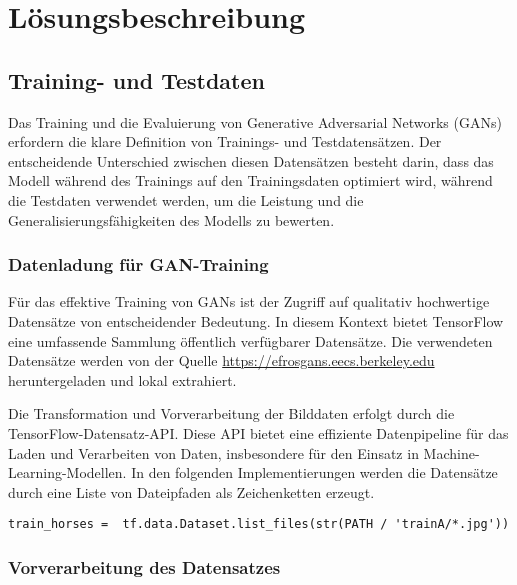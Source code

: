 \chapter{Lösungsbeschreibung}
\section{Training- und Testdaten}
Das Training und die Evaluierung von Generative Adversarial Networks (GANs) erfordern die klare Definition von Trainings- und Testdatensätzen. Der entscheidende Unterschied zwischen diesen Datensätzen besteht darin, dass das Modell während des Trainings auf den Trainingsdaten optimiert wird, während die Testdaten verwendet werden, um die Leistung und die Generalisierungsfähigkeiten des Modells zu bewerten.

\subsection{Datenladung für GAN-Training}
Für das effektive Training von GANs ist der Zugriff auf qualitativ hochwertige Datensätze von entscheidender Bedeutung. In diesem Kontext bietet TensorFlow eine umfassende Sammlung öffentlich verfügbarer Datensätze. Die verwendeten Datensätze werden von der Quelle \url{https://efrosgans.eecs.berkeley.edu} heruntergeladen und lokal extrahiert.



Die Transformation und Vorverarbeitung der Bilddaten erfolgt durch die TensorFlow-Datensatz-API. Diese API bietet eine effiziente Datenpipeline für das Laden und Verarbeiten von Daten, insbesondere für den Einsatz in Machine-Learning-Modellen. In den folgenden Implementierungen werden die Datensätze durch eine Liste von Dateipfaden als Zeichenketten erzeugt.

\begin{lstlisting}[language=pyhaff, caption={Erzeugung eines Tensorflow-Dataset aus der CycleGAN Implementierung}, label={cod:createDataset}]
train_horses =  tf.data.Dataset.list_files(str(PATH / 'trainA/*.jpg')) 
\end{lstlisting}

\subsection{Vorverarbeitung des Datensatzes}

